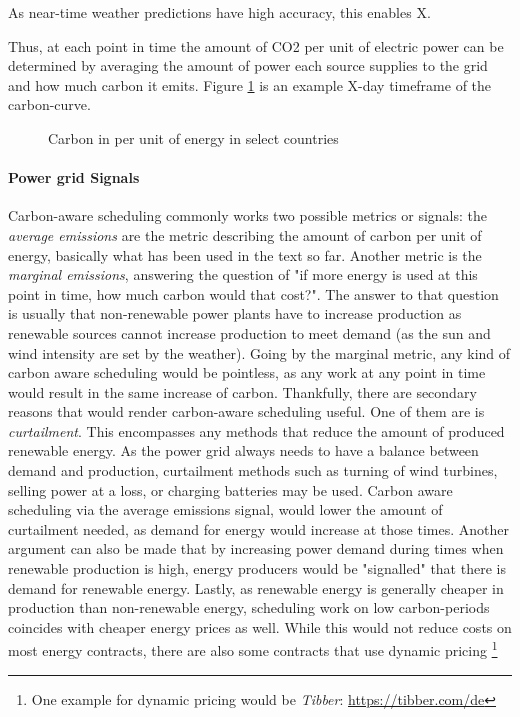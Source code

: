 As near-time weather predictions have high accuracy, this enables X.

Thus, at each point in time the amount of CO2 per unit of electric power can be determined by averaging the amount of power each source supplies to the grid and how much carbon it emits. Figure \ref{fig:carbon_curve} is an example X-day timeframe of the carbon-curve.

\begin{figure}
    \caption[short]{Carbon in per unit of energy in select countries}
    \label{fig:carbon_curve}
\end{figure}

\paragraph{Power grid Signals}
Carbon-aware scheduling commonly works two possible metrics or signals: the \emph{average emissions} are the metric describing the amount of carbon per unit of energy, basically what has been used in the text so far. Another metric is the \emph{marginal emissions}, answering the question of "if more energy is used at this point in time, how much carbon would that cost?". 
The answer to that question is usually that non-renewable power plants have to increase production as renewable sources cannot increase production to meet demand (as the sun and wind intensity are set by the weather). 
Going by the marginal metric, any kind of carbon aware scheduling would be pointless, as any work at any point in time would result in the same increase of carbon. 
Thankfully, there are secondary reasons that would render carbon-aware scheduling useful. One of them are is \emph{curtailment}. 
This encompasses any methods that reduce the amount of produced renewable energy. As the power grid always needs to have a balance between demand and production, curtailment methods such as turning of wind turbines, selling power at a loss, or charging batteries may be used. 
Carbon aware scheduling via the average emissions signal, would lower the amount of curtailment needed, as demand for energy would increase at those times.
Another argument can also be made that by increasing power demand during times when renewable production is high, energy producers would be "signalled" that there is demand for renewable energy.
Lastly, as renewable energy is generally cheaper in production than non-renewable energy, scheduling work on low carbon-periods coincides with cheaper energy prices as well. While this would not reduce costs on most energy contracts, there are also some contracts that use dynamic pricing \footnote{One example for dynamic pricing would be \emph{Tibber}: \url{https://tibber.com/de}}


